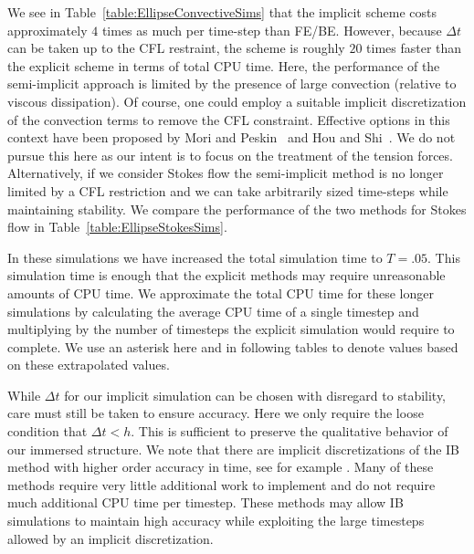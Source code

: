 We see in Table~\ref{table:EllipseConvectiveSims}
that the implicit scheme costs approximately $4$ times as much per time-step than FE/BE. However, because $\Delta t$ can be taken up to the CFL restraint, the scheme is roughly $20$ times faster than the explicit scheme in terms of total CPU time. 
Here, the performance of the semi-implicit approach is limited by the presence of large convection (relative to  viscous dissipation). Of course, one could employ a suitable implicit discretization of the convection terms to remove the CFL constraint.  Effective options in this context have been proposed by
Mori and Peskin~\cite{MP2008} and Hou and Shi~\cite{HS2008b}. We do not pursue this 
here as our intent is to focus on the treatment of the tension forces. Alternatively, if we consider Stokes flow the semi-implicit method
is no longer limited by a CFL restriction and we can take arbitrarily sized time-steps  while maintaining stability.
We compare the performance of the two methods for Stokes flow in Table~\ref{table:EllipseStokesSims}. 

In these simulations we have increased the total simulation time to $T = .05$. This simulation time is enough that the explicit methods may require unreasonable amounts of CPU time. We approximate the total CPU time for these longer simulations by calculating the average CPU time of a single timestep and multiplying by the number of timesteps the explicit simulation would require to complete. We use an asterisk here and in following tables to denote values based on these extrapolated values.

While $\Delta t$ for our implicit simulation can be chosen with disregard to stability, care must still be taken to ensure accuracy. Here we only require the loose condition that $\Delta t < h$. This is sufficient to preserve the qualitative behavior of our immersed structure. We note that there are implicit discretizations of the IB method with higher order accuracy in time, see for example \cite{NFGK2007}. Many of these methods require very little additional work to implement and do not require much additional CPU time per timestep. These methods may allow IB simulations to maintain high accuracy while exploiting the large timesteps allowed by an implicit discretization.

